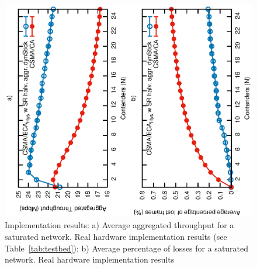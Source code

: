 	\begin{figure}[tb]
		\centering
		\includegraphics[width=\linewidth,angle=-90]{figures/tonFigs/implementation-combined.eps}
		\caption{Implementation results: a) Average aggregated throughput for a saturated network. Real hardware implementation results (see Table~\ref{tab:testbed}); b) Average percentage of losses for a saturated network. Real hardware implementation results}
		\label{fig:implementationResults}
	\end{figure}

%	



